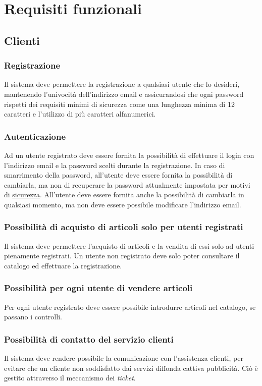 \documentclass[12pt,a4paper]{article}
\begin{document}
\newpage
\section{Requisiti funzionali}
\subsection{Clienti}
\subsubsection{Registrazione}
Il sistema deve permettere la registrazione a qualsiasi utente che lo desideri, mantenendo l'univocità dell'indirizzo email e assicurandosi che ogni password rispetti dei requisiti minimi di sicurezza come una lunghezza minima di 12 caratteri e l'utilizzo di più caratteri alfanumerici.

\subsubsection{Autenticazione}
Ad un utente registrato deve essere fornita la possibilità di effettuare il login con l'indirizzo email e la password scelti durante la registrazione. In caso di smarrimento della password, all'utente deve essere fornita la possibilità di cambiarla, ma non di recuperare la password attualmente impostata per motivi di  \hyperref[sec:security]{sicurezza}. All'utente deve essere fornita anche la possibilità di cambiarla in qualsiasi momento, ma non deve essere possibile modificare l'indirizzo email.

\subsubsection{Possibilità di acquisto di articoli solo per utenti registrati}
Il sistema deve permettere l'acquisto di articoli e la vendita di essi solo ad utenti pienamente registrati. Un utente non registrato deve solo poter consultare il catalogo ed effettuare la registrazione.

\subsubsection{Possibilità per ogni utente di vendere articoli}
Per ogni utente registrato deve essere possibile introdurre articoli nel catalogo, se passano i controlli.

\subsubsection{Possibilità di contatto del servizio clienti}
Il sistema deve rendere possibile la comunicazione con l'assistenza clienti, per evitare che un cliente non soddisfatto dai servizi diffonda cattiva pubblicità. Ciò è gestito attraverso il meccanismo dei \textit{ticket}.
\end{document}
